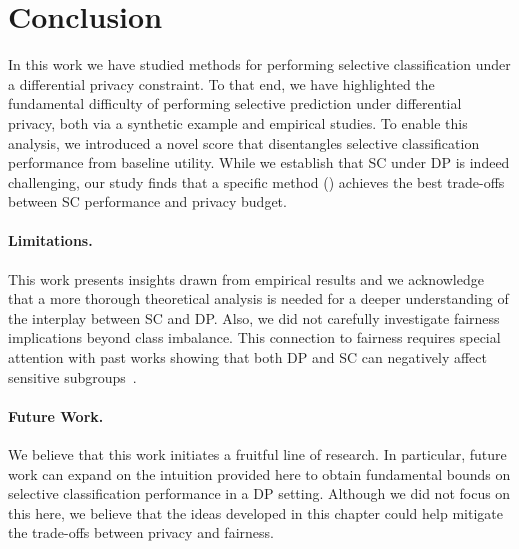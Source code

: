 


\section{Conclusion}
\label{sec:concl}

In this work we have studied methods for performing selective classification under a differential privacy constraint. To that end, we have highlighted the fundamental difficulty of performing selective prediction under differential privacy, both via a synthetic example and empirical studies. To enable this analysis, we introduced a novel score that disentangles selective classification performance from baseline utility. While we establish that SC under DP is indeed challenging, our study finds that a specific method (\sctd) achieves the best trade-offs between SC performance and privacy budget. %

\paragraph{Limitations.} This work presents insights drawn from empirical results and we acknowledge that a more thorough theoretical analysis is needed for a deeper understanding of the interplay between SC and DP. Also, we did not carefully investigate fairness implications beyond class imbalance. This connection to fairness requires special attention with past works showing that both DP and SC can negatively affect sensitive subgroups~\citep{jones2020selective, bagdasaryan2019differential}.

\paragraph{Future Work.} We believe that this work initiates a fruitful line of research. 
In particular, future work can expand on the intuition provided here to obtain fundamental bounds on selective classification performance in a DP setting. Although we did not focus on this here, we believe that the ideas developed in this chapter could help mitigate the trade-offs between privacy and fairness.


